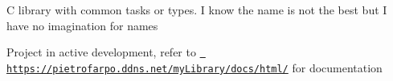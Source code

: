C library with common tasks or types. I know the name is not the best but I have no imagination for names

Project in active development, refer to \href{https://pietrofarpo.ddns.net/myLibrary/docs/html/}{\texttt{ https\+://pietrofarpo.\+ddns.\+net/my\+Library/docs/html/}} for documentation 